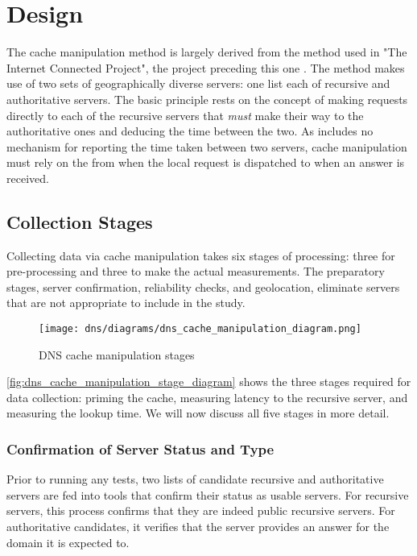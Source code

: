 \section{Design}
The \dns cache manipulation method is largely derived from the method used in "The Internet Connected Project", the project preceding this one \cite{Fakult2019}. The method makes use of two sets of geographically diverse \dns servers: one list each of recursive and authoritative servers. The basic principle rests on the concept of making requests directly to each of the recursive servers that \textit{must} make their way to the authoritative ones and deducing the time between the two. As \dns includes no mechanism for reporting the time taken between two servers, \dns cache manipulation must rely on the \rtt from when the local request is dispatched to when an answer is received.

\subsection{Collection Stages}\label{sec:dns_design_collection_stages}

Collecting data via \dns cache manipulation takes six stages of processing: three for pre-processing and three to make the actual measurements. The preparatory stages, server confirmation, reliability checks, and geolocation, eliminate servers that are not appropriate to include in the study.

\begin{figure}[h]
    \centering
    \texttt{[image: dns/diagrams/dns\_cache\_manipulation\_diagram.png]}
    \caption{DNS cache manipulation stages}
    \label{fig:dns_cache_manipulation_stage_diagram}
\end{figure}

\autoref{fig:dns_cache_manipulation_stage_diagram} shows the three stages required for data collection: priming the \dns cache, measuring latency to the recursive \dns server, and measuring the lookup time. We will now discuss all five stages in more detail.

\subsubsection{Confirmation of Server Status and Type}\label{sec:dns_des_server_conf}
Prior to running any tests, two lists of candidate recursive and authoritative servers are fed into tools that confirm their status as usable servers. For recursive servers, this process confirms that they are indeed public recursive servers. For authoritative candidates, it verifies that the server provides an answer for the domain it is expected to.

